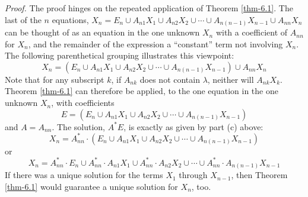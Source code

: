 \begin{thm}
\emph{Proof.} The proof hinges on the repeated application of Theorem \ref{thm-6.1}. The
last of the $n$ equations, $X_n = E_n \cup A_{n1}X_1 \cup A_{n2}X_2 \cup \cdots
\cup A_{n(n-1)}X_{n-1} \cup A_{nn}X_{n}$ can be thought of as an equation in the
one unknown $X_n$ with a coefficient of $A_{nn}$ for $X_n$, and the remainder of
the expression a ``constant'' term not involving $X_n$. The following
parenthetical grouping illustrates this viewpoint:
\[ X_n = (E_n \cup A_{n1}X_1 \cup A_{n2}X_2 \cup \cdots \cup A_{n(n-1)}X_{n-1})
	\cup A_{nn}X_n \]
Note that for any subscript $k$, if $A_{nk}$ does not contain $\lambda$, neither
will $A_{nk}X_k$. Theorem \ref{thm-6.1} can therefore be applied, to the one equation in
the one unknown $X_n$, with coefficients
\[ E = (E_n \cup A_{n1}X_1 \cup A_{n2}X_2 \cup \cdots \cup A_{n(n-1)}X_{n-1}) \]
and $A = A_{nn}$. The solution, $A^*E$, is exactly as given by part (c) above:
\[ X_n = A^*_{nn} \cdot (E_n \cup A_{n1}X_1 \cup A_{n2}X_2 \cup \cdots \cup
	A_{n(n-1)}X_{n-1}) \]
or
\[ X_n = A^*_{nn} \cdot E_n \cup A^*_{nn} \cdot A_{n1}X_1 \cup A^*_{nn} \cdot
	A_{n2}X_2 \cup \cdots \cup A^*_{nn} \cdot A_{n(n-1)}X_{n-1} \]
If there was a unique solution for the terms $X_1$ through $X_{n-1}$, then
Theorem \ref{thm-6.1} would guarantee a unique solution for $X_n$, too.


\end{thm}
